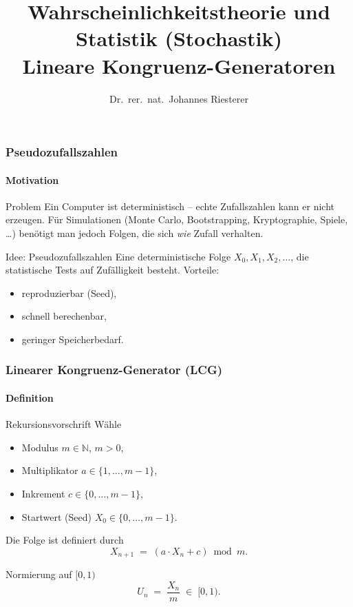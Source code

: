 \documentclass{beamer}
\begin{document}
\title[Stochastik]
{Wahrscheinlichkeitstheorie und Statistik (Stochastik)
\\[1ex]
Lineare Kongruenz-Generatoren}
\author[Dr. Johannes Riesterer]
{Dr.\ rer.\ nat.\ Johannes Riesterer}
\date{}
\subject{Stochastik}

\frame{\titlepage}


\begin{frame}
    \frametitle{Pseudozufallszahlen}
    \framesubtitle{Motivation}

\begin{block}{Problem}
Ein Computer ist deterministisch -- echte Zufallszahlen kann er nicht
erzeugen. Für Simulationen (Monte Carlo, Bootstrapping, Kryptographie,
Spiele, \ldots) benötigt man jedoch Folgen, die sich \emph{wie} Zufall
verhalten.
\end{block}

\begin{block}{Idee: Pseudozufallszahlen}
Eine deterministische Folge $X_0, X_1, X_2, \ldots$, die statistische
Tests auf Zufälligkeit besteht. Vorteile:
\begin{itemize}
    \item reproduzierbar (Seed),
    \item schnell berechenbar,
    \item geringer Speicherbedarf.
\end{itemize}
\end{block}

\end{frame}


\begin{frame}
    \frametitle{Linearer Kongruenz-Generator (LCG)}
    \framesubtitle{Definition}

\begin{block}{Rekursionsvorschrift}
Wähle
\begin{itemize}
    \item Modulus $m \in \mathbb{N}$, $m > 0$,
    \item Multiplikator $a \in \{1, \ldots, m-1\}$,
    \item Inkrement $c \in \{0, \ldots, m-1\}$,
    \item Startwert (Seed) $X_0 \in \{0, \ldots, m-1\}$.
\end{itemize}
Die Folge ist definiert durch
\[
    X_{n+1} \;=\; (a \cdot X_n + c) \bmod m.
\]
\end{block}

\begin{block}{Normierung auf $[0,1)$}
\[
    U_n \;=\; \frac{X_n}{m} \;\in\; [0,1).
\]
\end{block}

\end{frame}
\end{document}
